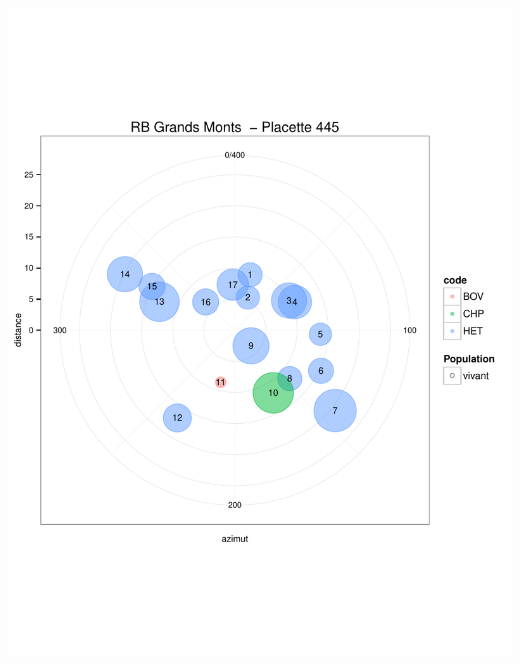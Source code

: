 \documentclass[a4paper]{book}\usepackage[]{graphicx}\usepackage[]{color}
\makeatletter
\def\maxwidth{ %
  \ifdim\Gin@nat@width>\linewidth
    \linewidth
  \else
    \Gin@nat@width
  \fi
}
\newenvironment{knitrout}{}{} %
\makeatother
\begin{document}
\begin{knitrout}
{\centering \includegraphics[width=\maxwidth]{Figures/PlanArbres-46} 

}





\end{knitrout}
\end{document}
